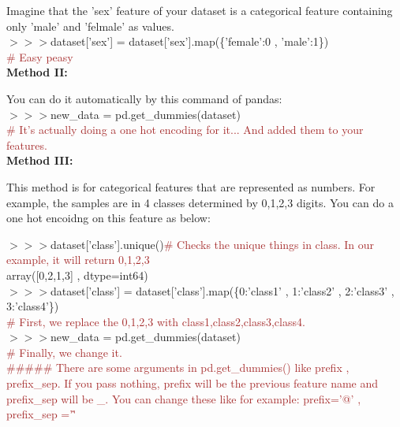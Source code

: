 \documentclass[a4paper,18pt]{article}
\begin{document}
Imagine that the 'sex' feature of your dataset is a categorical feature containing only 'male' and 'felmale' as values.\\

$>>>$dataset['sex'] = dataset['sex'].map(\{'female':0 , 'male':1\})\\

{\textcolor{brown}{\# Easy peasy}}\\

\textbf{Method II:\\}

You can do it automatically by this command of pandas:\\

$>>>$new\_data = pd.get\_dummies(dataset)\\

{\textcolor{brown}{\# It's actually doing a one hot encoding for it... And added them to your features.}}\\

\textbf{Method III:\\}

This method is for categorical features that are represented as numbers. For example, the samples are in 4 classes determined by 0,1,2,3 digits. You can do a one hot encoidng on this feature as below:

$>>>$dataset['class'].unique(){\textcolor{brown}{\# Checks the unique things in class. In our example, it will return 0,1,2,3}}\\

\hspace*{14pt}array([0,2,1,3] , dtype=int64)\\

$>>>$dataset['class'] = dataset['class'].map(\{0:'class1' , 1:'class2' , 2:'class3' , 3:'class4'\})\\

{\textcolor{brown}{\# First, we replace the 0,1,2,3 with class1,class2,class3,class4.}}\\

$>>>$new\_data = pd.get\_dummies(dataset)\\

{\textcolor{brown}{\# Finally, we change it.}}\\


{\textcolor{brown}{\#\#\#\#\# There are some arguments in pd.get\_dummies() like prefix , prefix\_sep. If you pass nothing, prefix will be the previous feature name and prefix\_sep will be \_. You can change these like for example: prefix='@' , prefix\_sep ='\^' }}\\
\end{document}
